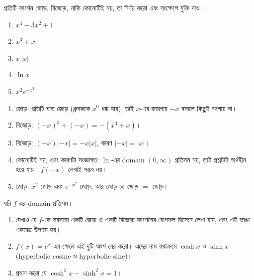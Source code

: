 \documentclass[11pt]{article}
\begin{document}
 প্রতিটি ফাংশন জোড়, বিজোড়, নাকি কোনোটিই নয়, তা নির্ণয় করো এবং সংক্ষেপে
যুক্তি দাও।
\begin{enumerate}
  \item $x^{4} - 3x^{2} + 1$
  \item $x^{3} + x$
  \item $x \, |x|$
  \item $\ln x$
  \item $x^{2} e^{-x^{2}}$
\end{enumerate}

\begin{sol}
\begin{enumerate}
  \item জোড়: প্রতিটি ঘাত জোড় (ধ্রুবককে $x^{0}$ ধরা যায়), তাই $x$-এর জায়গায়
        $-x$ বসালে কিছুই বদলায় না।
  \item বিজোড়: $(-x)^{3} + (-x) = -(x^{3}+x)$।
  \item বিজোড়: $(-x)|-x| = -x|x|$, কারণ $|-x| = |x|$।
  \item কোনোটিই নয়, এবং কারণটা সংজ্ঞাগত: $\ln$-এর domain $(0,\infty)$ প্রতিসম
        নয়, তাই প্রশ্নটাই অর্থহীন হয়ে যায়। $f(-x)$ লেখাই সম্ভব নয়।
  \item জোড়: $x^{2}$ জোড় এবং $e^{-x^{2}}$ জোড়, আর জোড় $\times$ জোড় $=$ জোড়।
\end{enumerate}
\end{sol}

 ধরি $f$-এর domain প্রতিসম।
\begin{enumerate}
  \item দেখাও যে $f$-কে সবসময় একটি জোড় ও একটি বিজোড় ফাংশনের যোগফল হিসেবে লেখা
        যায়, এবং এই ভাঙা একমাত্র উপায়ে হয়।
  \item $f(x) = e^{x}$-এর ক্ষেত্রে এই দুটি অংশ বের করো। এদের নাম যথাক্রমে
        $\cosh x$ ও $\sinh x$ (hyperbolic cosine ও hyperbolic sine)।
  \item প্রমাণ করো যে $\cosh^{2} x - \sinh^{2} x = 1$।
\end{enumerate}
\end{document}
